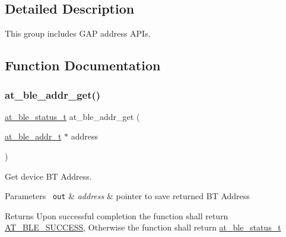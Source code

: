\subsection{Detailed Description}
This group includes G\+AP address A\+P\+Is. 



\subsection{Function Documentation}
\mbox{\label{group__gap__addr__mgmt__group_ga755bea90a1b103d981b9d3ebdd6686c1}} 
\subsubsection{\texorpdfstring{at\_ble\_addr\_get()}{at\_ble\_addr\_get()}}
{\footnotesize\ttfamily \mbox{\hyperlink{group__error__codes__group_ga3b1db9b95feb157b3c188ca27fe76988}{at\+\_\+ble\+\_\+status\+\_\+t}} at\+\_\+ble\+\_\+addr\+\_\+get (\begin{DoxyParamCaption}\item[{\mbox{\hyperlink{structat__ble__addr__t}{at\+\_\+ble\+\_\+addr\+\_\+t}} $\ast$}]{address }\end{DoxyParamCaption})}



Get device BT Address. 


\begin{DoxyParams}[1]{Parameters}
\mbox{\texttt{ out}}  & {\em address} & pointer to save returned BT Address\\
\hline
\end{DoxyParams}
\begin{DoxyReturn}{Returns}
Upon successful completion the function shall return \mbox{\hyperlink{group__error__codes__group_gga3b1db9b95feb157b3c188ca27fe76988a7e3bfff5387331cd4f2c56cbcbbd7e19}{A\+T\+\_\+\+B\+L\+E\+\_\+\+S\+U\+C\+C\+E\+SS}}, Otherwise the function shall return \mbox{\hyperlink{at__ble__api_8h_ace24eb4e5ca3f325c663b809da5feb92}{at\+\_\+ble\+\_\+status\+\_\+t}} 
\end{DoxyReturn}
\mbox{\label{group__gap__addr__mgmt__group_gaef7a696c0237045a4f8ffd0c3bd242c9}} 
